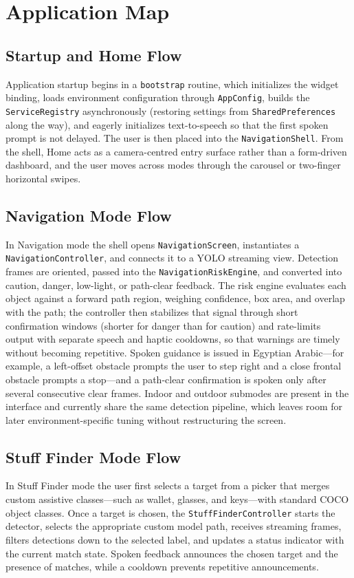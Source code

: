 \documentclass[a4paper]{report}
\begin{document}
\section{Application Map}
\subsection{Startup and Home Flow}
Application startup begins in a \texttt{bootstrap} routine, which initializes the widget binding, loads environment configuration through \texttt{AppConfig}, builds the \texttt{ServiceRegistry} asynchronously (restoring settings from \texttt{SharedPreferences} along the way), and eagerly initializes text-to-speech so that the first spoken prompt is not delayed. The user is then placed into the \texttt{NavigationShell}. From the shell, Home acts as a camera-centred entry surface rather than a form-driven dashboard, and the user moves across modes through the carousel or two-finger horizontal swipes.

\subsection{Navigation Mode Flow}
In Navigation mode the shell opens \texttt{NavigationScreen}, instantiates a \texttt{NavigationController}, and connects it to a YOLO streaming view. Detection frames are oriented, passed into the \texttt{NavigationRiskEngine}, and converted into caution, danger, low-light, or path-clear feedback. The risk engine evaluates each object against a forward path region, weighing confidence, box area, and overlap with the path; the controller then stabilizes that signal through short confirmation windows (shorter for danger than for caution) and rate-limits output with separate speech and haptic cooldowns, so that warnings are timely without becoming repetitive. Spoken guidance is issued in Egyptian Arabic---for example, a left-offset obstacle prompts the user to step right and a close frontal obstacle prompts a stop---and a path-clear confirmation is spoken only after several consecutive clear frames. Indoor and outdoor submodes are present in the interface and currently share the same detection pipeline, which leaves room for later environment-specific tuning without restructuring the screen.

\subsection{Stuff Finder Mode Flow}
In Stuff Finder mode the user first selects a target from a picker that merges custom assistive classes---such as wallet, glasses, and keys---with standard COCO object classes. Once a target is chosen, the \texttt{StuffFinderController} starts the detector, selects the appropriate custom model path, receives streaming frames, filters detections down to the selected label, and updates a status indicator with the current match state. Spoken feedback announces the chosen target and the presence of matches, while a cooldown prevents repetitive announcements.
\end{document}
